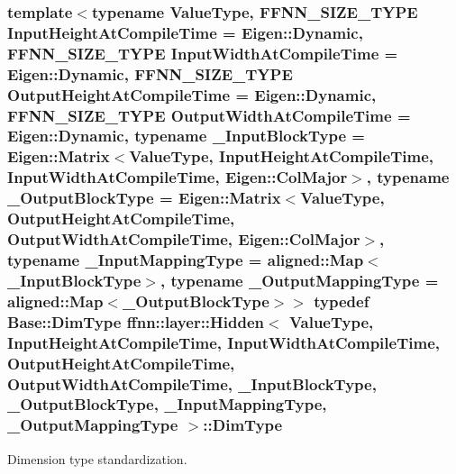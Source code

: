 \hypertarget{classffnn_1_1layer_1_1_hidden_aba8b203c8b193a53d19fc26c10b14872}{
\subsubsection[{Dim\-Type}]{\setlength{\rightskip}{0pt plus 5cm}template$<$typename Value\-Type, F\-F\-N\-N\-\_\-\-S\-I\-Z\-E\-\_\-\-T\-Y\-P\-E Input\-Height\-At\-Compile\-Time = Eigen\-::\-Dynamic, F\-F\-N\-N\-\_\-\-S\-I\-Z\-E\-\_\-\-T\-Y\-P\-E Input\-Width\-At\-Compile\-Time = Eigen\-::\-Dynamic, F\-F\-N\-N\-\_\-\-S\-I\-Z\-E\-\_\-\-T\-Y\-P\-E Output\-Height\-At\-Compile\-Time = Eigen\-::\-Dynamic, F\-F\-N\-N\-\_\-\-S\-I\-Z\-E\-\_\-\-T\-Y\-P\-E Output\-Width\-At\-Compile\-Time = Eigen\-::\-Dynamic, typename \-\_\-\-Input\-Block\-Type = Eigen\-::\-Matrix$<$\-Value\-Type, Input\-Height\-At\-Compile\-Time, Input\-Width\-At\-Compile\-Time, Eigen\-::\-Col\-Major$>$, typename \-\_\-\-Output\-Block\-Type = Eigen\-::\-Matrix$<$\-Value\-Type, Output\-Height\-At\-Compile\-Time, Output\-Width\-At\-Compile\-Time, Eigen\-::\-Col\-Major$>$, typename \-\_\-\-Input\-Mapping\-Type = aligned\-::\-Map$<$\-\_\-\-Input\-Block\-Type$>$, typename \-\_\-\-Output\-Mapping\-Type = aligned\-::\-Map$<$\-\_\-\-Output\-Block\-Type$>$$>$ typedef {\bf Base\-::\-Dim\-Type} {\bf ffnn\-::layer\-::\-Hidden}$<$ Value\-Type, Input\-Height\-At\-Compile\-Time, Input\-Width\-At\-Compile\-Time, Output\-Height\-At\-Compile\-Time, Output\-Width\-At\-Compile\-Time, \-\_\-\-Input\-Block\-Type, \-\_\-\-Output\-Block\-Type, \-\_\-\-Input\-Mapping\-Type, \-\_\-\-Output\-Mapping\-Type $>$\-::{\bf Dim\-Type}}}\label{classffnn_1_1layer_1_1_hidden_aba8b203c8b193a53d19fc26c10b14872}


Dimension type standardization. 

